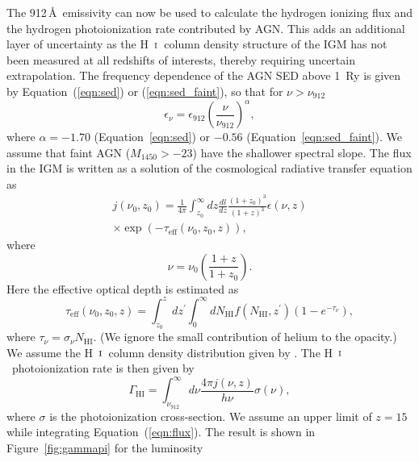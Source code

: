 \documentclass[fleqn,usenatbib]{mnras}
\def\HI{\hbox{H~$\scriptstyle\rm I$}}
\begin{document}
      The 912\,\AA\ emissivity can now be used to calculate the hydrogen
      ionizing flux and the hydrogen photoionization rate contributed by
      AGN.  This adds an additional layer of uncertainty as the \HI\ column
      density structure of the IGM has not been measured at all redshifts of
      interests, thereby requiring uncertain extrapolation.  The frequency
      dependence of the AGN SED above 1~Ry is given by
      Equation~(\ref{eqn:sed}) or (\ref{eqn:sed_faint}), so that for $\nu >
      \nu_{912}$
      \begin{equation}
        \epsilon_\nu = \epsilon_{912}\left(\frac{\nu}{\nu_{912}}\right)^\alpha,
        \label{eqn:epsilon_freq}
      \end{equation}
      where $\alpha=-1.70$ (Equation~\ref{eqn:sed}) or $-0.56$
      (Equation~\ref{eqn:sed_faint}).  We assume that faint AGN
      ($M_{1450}>-23$) have the shallower spectral slope.  The flux in the
      IGM is written as a solution of the cosmological radiative transfer
      equation as \citep{2012ApJ...746..125H}
      \begin{multline}
        j(\nu_0, z_0)=\frac{1}{4\pi}\int_{z_0}^\infty dz\frac{dl}{dz}
        \frac{(1+z_0)^3}{(1+z)^3}\epsilon(\nu,z)\\
        \times\exp{(-\tau_\mathrm{eff}(\nu_0, z_0, z))},
        \label{eqn:flux}
      \end{multline}
      where
      \begin{equation}
        \nu = \nu_0\left(\frac{1+z}{1+z_0}\right).
      \end{equation}
      Here the effective optical depth is estimated as
      \begin{equation}
        \tau_\mathrm{eff}(\nu_0, z_0, z) = \int_{z_0}^z dz^\prime\int_0^\infty
        dN_\mathrm{HI} f(N_\mathrm{HI}, z^\prime) (1-e^{-\tau_\nu}),
      \end{equation}
      where $\tau_\nu=\sigma_\nu N_\mathrm{HI}$.  (We ignore the small
      contribution of helium to the opacity.)  We assume the \HI\ column
      density distribution given by \citet{2012ApJ...746..125H}.  The
      \HI\ photoionization rate is then given by
      \begin{equation}
        \Gamma_\mathrm{HI}=\int_{\nu_{912}}^\infty d\nu
        \frac{4\pi j(\nu,z)}{h\nu} \sigma(\nu),
      \end{equation}
      where $\sigma$ is the photoionization cross-section.  We assume an
      upper limit of $z=15$ while integrating Equation~(\ref{eqn:flux}).
      The result is shown in Figure~\ref{fig:gammapi} for the luminosity
\end{document}
